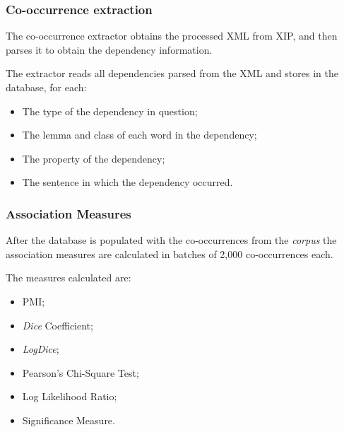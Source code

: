 \subsubsection*{Co-occurrence extraction}

The co-occurrence extractor obtains the processed XML from XIP, and then parses
it to obtain the dependency information.

The extractor reads all dependencies parsed from the XML and stores in the
database, for each:

\begin{itemize}
  \item The type of the dependency in question;
  \item The lemma and class of each word in the dependency;
  \item The property of the dependency;
  \item The sentence in which the dependency occurred.
\end{itemize}

\subsubsection*{Association Measures}

After the database is populated with the co-occurrences from the \textit{corpus}
the association measures are calculated in batches of 2,000 co-occurrences
each.

The measures calculated are:

\begin{itemize}
  \item \ac{PMI};
  \item \textit{Dice} Coefficient;
  \item \textit{LogDice};
  \item Pearson's Chi-Square Test;
  \item Log Likelihood Ratio;
  \item Significance Measure.
\end{itemize}

